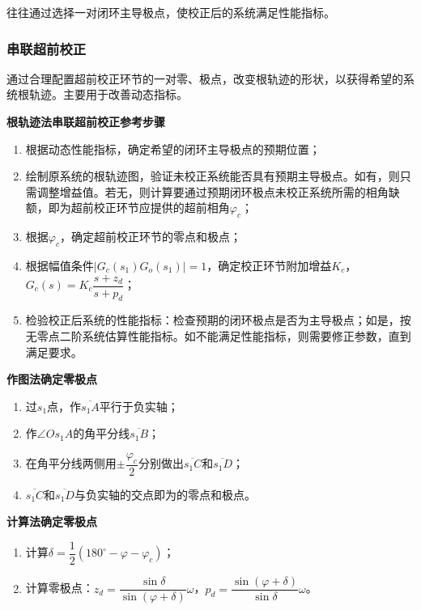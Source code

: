 \documentclass[cn, blue, normal, 12pt]{elegantnote}
\begin{document}
往往通过选择一对闭环主导极点，使校正后的系统满足性能指标。

\subsubsection{串联超前校正}

通过合理配置超前校正环节的一对零、极点，改变根轨迹的形状，以获得希望的系统根轨迹。主要用于改善动态指标。

\textbf{根轨迹法串联超前校正参考步骤}

\begin{enumerate}
    \setlength{\itemsep}{6pt}
    \item 根据动态性能指标，确定希望的闭环主导极点的预期位置；
    \item 绘制原系统的根轨迹图，验证未校正系统能否具有预期主导极点。如有，则只需调整增益值。若无，则计算要通过预期闭环极点未校正系统所需的相角缺额，即为超前校正环节应提供的超前相角$\varphi_c$；
    \item 根据$\varphi_c$，确定超前校正环节的零点和极点；
    \item 根据幅值条件$|G_c(s_1)G_o(s_1)|=1$，确定校正环节附加增益$K_c$，$G_c(s)=K_c\dfrac{s+z_d}{s+p_d}$；
    \item 检验校正后系统的性能指标：检查预期的闭环极点是否为主导极点；如是，按无零点二阶系统估算性能指标。如不能满足性能指标，则需要修正参数，直到满足要求。
\end{enumerate}

\textbf{作图法确定零极点}

\begin{enumerate}
    \setlength{\itemsep}{6pt}
    \item 过$s_1$点，作$\overline{s_1 A}$平行于负实轴；
    \item 作$\angle O s_1 A$的角平分线$\overline{s_1 B}$；
    \item 在角平分线两侧用$\pm\dfrac{\varphi_c}{2}$分别做出$\overline{s_1 C}$和$\overline{s_1 D}$；
    \item $\overline{s_1 C}$和$\overline{s_1 D}$与负实轴的交点即为的零点和极点。
\end{enumerate}

\textbf{计算法确定零极点}

\begin{enumerate}
    \setlength{\itemsep}{6pt}
    \item 计算$\delta=\dfrac{1}{2}(180^{\circ}-\varphi-\varphi_c)$；
    \item 计算零极点：$z_d=\dfrac{\sin{\delta}}{\sin{(\varphi+\delta)}}\omega$，$p_d=\dfrac{\sin{(\varphi+\delta)}}{\sin{\delta}}\omega$。
\end{enumerate}
\end{document}
